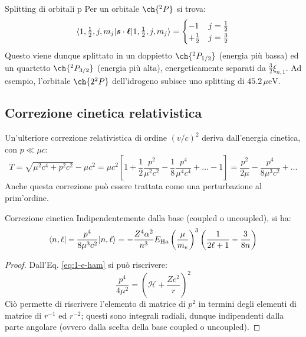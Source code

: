 \begin{example}{Splitting di orbitali p}{}
	Per un orbitale $ \ch{^2 P} $ si trova:
	\begin{equation*}
		\braket{1, \tfrac{1}{2}, j, m_j | \boldsymbol{s} \cdot \boldsymbol{\ell} | 1, \tfrac{1}{2}, j, m_j} =
		\begin{cases}
			-1 & j = \frac{1}{2} \\
			+ \frac{1}{2} & j = \frac{3}{2}
		\end{cases}
	\end{equation*}
	Questo viene dunque splittato in un doppietto $ \ch{^2P_{1/2}} $ (energia più bassa) ed un quartetto $ \ch{^2P_{3/2}} $ (energia più alta), energeticamente separati da $ \frac{3}{2} \xi_{n,1} $. Ad esempio, l'orbitale $ \ch{2^2P} $ dell'idrogeno subisce uno splitting di $ 45.2 \,\mu\text{eV} $.
\end{example}

\subsection{Correzione cinetica relativistica}

Un'ulteriore correzione relativistica di ordine $ (v/c)^2 $ deriva dall'energia cinetica, con $ p \ll \mu c $:
\begin{equation*}
	T = \sqrt{\mu^2 c^4 + p^2 c^2} - \mu c^2 = \mu c^2 \left[ 1 + \frac{1}{2} \frac{p^2}{\mu^2 c^2} - \frac{1}{8} \frac{p^4}{\mu^4 c^4} + \dots - 1 \right] = \frac{p^2}{2\mu} - \frac{p^4}{8 \mu^3 c^2} + \dots
\end{equation*}
Anche questa correzione può essere trattata come una perturbazione al prim'ordine.

\begin{proposition}{Correzione cinetica}{}
	Indipendentemente dalla base (coupled o uncoupled), si ha:
	\begin{equation}
		\braket{n,\ell | - \frac{p^4}{8 \mu^3 c^2} | n,\ell} = - \frac{Z^4 \alpha^2}{n^3} E_\text{Ha} \left( \frac{\mu}{m_e} \right)^3 \left( \frac{1}{2\ell + 1} - \frac{3}{8n} \right)
		\label{eq:kin-corr}
	\end{equation}

	\tcblower

	\begin{proof}
		Dall'Eq. \ref{eq:1-e-ham} si può riscrivere:
		\begin{equation*}
			\frac{p^4}{4\mu^2} = \left( \mathcal{H} + \frac{Ze^2}{r} \right)^2
		\end{equation*}
		Ciò permette di riscrivere l'elemento di matrice di $ p^2 $ in termini degli elementi di matrice di $ r^{-1} $ ed $ r^{-2} $; questi sono integrali radiali, dunque indipendenti dalla parte angolare (ovvero dalla scelta della base coupled o uncoupled).
	\end{proof}
\end{proposition}

